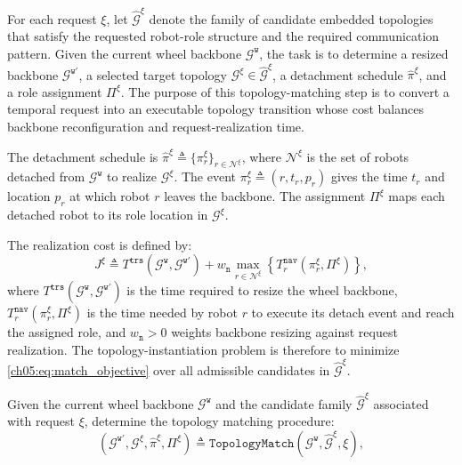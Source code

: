 For each request \(\xi\), let
\(\widehat{\mathcal{G}}^{\xi}\) denote the family of candidate
embedded topologies that satisfy the requested robot-role structure
and the required communication pattern. Given the current wheel
backbone \(\mathcal{G}^{\texttt{w}}\), the task is to determine a
resized backbone \(\mathcal{G}^{\texttt{w}'}\), a selected target
topology \(\mathcal{G}^{\xi}\in\widehat{\mathcal{G}}^{\xi}\), a
detachment schedule \(\widehat{\pi}^{\xi}\), and a role assignment
\(\Pi^{\xi}\). The purpose of this topology-matching step is to convert
a temporal request into an executable topology transition whose cost
balances backbone reconfiguration and request-realization time.
\begin{revision}
The detachment schedule is \(\widehat{\pi}^{\xi}\triangleq
\{\pi_r^{\xi}\}_{r\in\mathcal{N}^{\xi}}\),
where \(\mathcal{N}^{\xi}\) is the set of robots detached from
\(\mathcal{G}^{\texttt{w}}\) to realize \(\mathcal{G}^{\xi}\).
The event \(\pi_r^{\xi}\triangleq(r,t_r,p_r)\) gives the time \(t_r\) and
location \(p_r\) at which robot \(r\) leaves the backbone.
The assignment \(\Pi^{\xi}\) maps each detached robot to its role location
in \(\mathcal{G}^{\xi}\).
\end{revision}
The realization cost is defined by:
\begin{equation}
\label{ch05:eq:match_objective}
J^{\xi}\triangleq
T^{\texttt{trs}}\!\left(
\mathcal{G}^{\texttt{w}},\mathcal{G}^{\texttt{w}'}
\right)
+
w_{\texttt{n}}
\max_{r\in\mathcal{N}^{\xi}}
\left\{
T_r^{\texttt{nav}}(\pi_r^{\xi},\Pi^{\xi})
\right\},
\end{equation}
where \(T^{\texttt{trs}}(
\mathcal{G}^{\texttt{w}},\mathcal{G}^{\texttt{w}'})\) is the time
required to resize the wheel backbone,
\(T_r^{\texttt{nav}}(\pi_r^{\xi},\Pi^{\xi})\) is the time needed by
robot \(r\) to execute its detach event and reach the assigned role,
and \(w_{\texttt{n}}>0\) weights backbone resizing against request
realization.
The topology-instantiation problem is therefore to minimize
\eqref{ch05:eq:match_objective} over all admissible candidates in
\(\widehat{\mathcal{G}}^{\xi}\).

\begin{problem}
\label{ch05:prob:topology_matching}
Given the current wheel backbone \(\mathcal{G}^{\texttt{w}}\) and
the candidate family \(\widehat{\mathcal{G}}^{\xi}\) associated
with request \(\xi\), determine the topology matching procedure:
\begin{equation}
\label{ch05:eq:single_topologymatch}
\left(
\mathcal{G}^{\texttt{w}'},\mathcal{G}^{\xi},
\widehat{\pi}^{\xi},\Pi^{\xi}
\right)\triangleq \texttt{TopologyMatch}\!\left(
\mathcal{G}^{\texttt{w}},\widehat{\mathcal{G}}^{\xi},\xi
\right),
\end{equation}
\end{problem}

